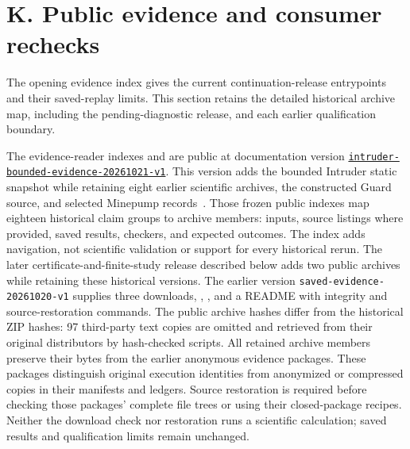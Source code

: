 \section*{K. Public evidence and consumer rechecks}
The opening evidence index gives the current continuation-release
entrypoints and their saved-replay limits. This section retains the
detailed historical archive map, including the pending-diagnostic release,
and each earlier qualification boundary.

The evidence-reader indexes  and
 are public at documentation version
\href{https://github.com/research-artifact-archive/seams2027/tree/intruder-bounded-evidence-20261021-v1}{\nolinkurl{intruder-bounded-evidence-20261021-v1}}.
This version adds the bounded Intruder static snapshot while retaining
eight earlier scientific archives, the constructed Guard source, and
selected Minepump records~\cite{savedartifact}.
Those frozen public indexes map eighteen historical claim groups to archive members: inputs,
source listings where provided, saved results, checkers, and expected outcomes.
The index adds navigation, not scientific validation or support for every
historical rerun. The later certificate-and-finite-study release described
below adds two public archives while retaining these historical versions.
The earlier version \texttt{saved-evidence-20261020-v1} supplies three
downloads, , , and a README
with integrity and source-restoration commands. The public archive hashes
differ from the historical ZIP hashes: 97 third-party text copies are
omitted and retrieved from their original distributors by hash-checked
scripts. All retained archive members preserve their bytes from the
earlier anonymous evidence packages. These packages distinguish original
execution identities from anonymized or compressed copies in their
manifests and ledgers. Source restoration is required before checking
those packages' complete file trees or using their closed-package
recipes. Neither the download
check nor restoration runs a scientific calculation; saved results and
qualification limits remain unchanged.



